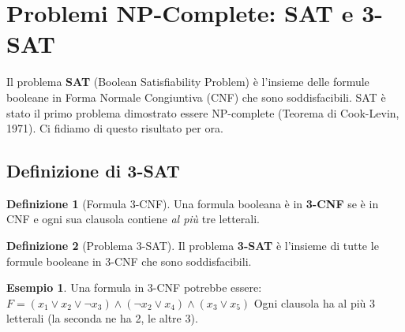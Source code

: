 \documentclass[a4paper]{article}
\theoremstyle{definition} %
\newtheorem{definition}{Definizione}
\newtheorem{example}{Esempio}
\begin{document}


\section{Problemi NP-Complete: SAT e 3-SAT}

Il problema \textbf{SAT} (Boolean Satisfiability Problem) è l'insieme delle formule booleane in Forma Normale Congiuntiva (CNF) che sono soddisfacibili. SAT è stato il primo problema dimostrato essere NP-complete (Teorema di Cook-Levin, 1971). Ci fidiamo di questo risultato per ora.

\subsection{Definizione di 3-SAT}

\begin{definition}[Formula 3-CNF]
Una formula booleana è in \textbf{3-CNF} se è in CNF e ogni sua clausola contiene \emph{al più} tre letterali.
\end{definition}

\begin{definition}[Problema 3-SAT]
Il problema \textbf{3-SAT} è l'insieme di tutte le formule booleane in 3-CNF che sono soddisfacibili.
\end{definition}

\begin{example}
Una formula in 3-CNF potrebbe essere:
$F = (x_1 \lor x_2 \lor \neg x_3) \land (\neg x_2 \lor x_4) \land (x_3 \lor x_5)$
Ogni clausola ha al più 3 letterali (la seconda ne ha 2, le altre 3).
\end{example}
\end{document}
